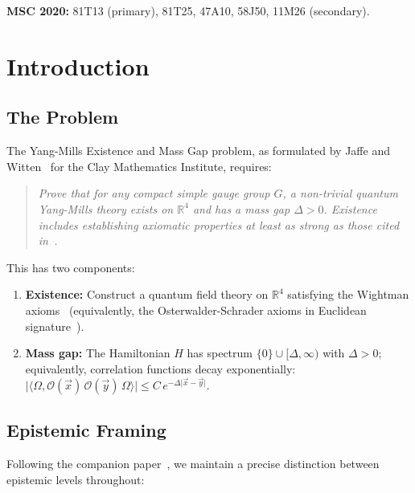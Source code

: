 \documentclass[11pt,a4paper]{article}
\theoremstyle{plain}
\theoremstyle{remark}
\renewcommand{\Omega}{\varOmega}
\newcommand{\R}{\mathbb{R}}
\newcommand{\abs}[1]{\lvert #1 \rvert}
\begin{document}
\vspace{12pt}
\noindent\textbf{\color{accent}MSC 2020:}
81T13 (primary), 81T25, 47A10, 58J50, 11M26 (secondary).

\newpage

\section{Introduction}
\label{sec:intro}

\subsection{The Problem}

The Yang-Mills Existence and Mass Gap problem, as formulated by Jaffe and
Witten~\cite{jaffe-witten2000} for the Clay Mathematics Institute, requires:

\begin{quote}
\itshape
Prove that for any compact simple gauge group $G$, a non-trivial quantum
Yang-Mills theory exists on $\R^4$ and has a mass gap $\Delta > 0$.
Existence includes establishing axiomatic properties at least as strong as
those cited in~\cite{osterwalder-schrader1973, osterwalder-schrader1975}.
\end{quote}

This has two components:
\begin{enumerate}[label=(\roman*)]
\item \textbf{Existence:} Construct a quantum field theory on $\R^4$
  satisfying the Wightman axioms~\cite{streater-wightman1964}
  (equivalently, the Osterwalder-Schrader axioms in Euclidean
  signature~\cite{osterwalder-schrader1973}).
\item \textbf{Mass gap:} The Hamiltonian $H$ has spectrum
  $\{0\} \cup [\Delta, \infty)$ with $\Delta > 0$; equivalently,
  correlation functions decay exponentially: $\abs{\langle\Omega,
  \mathcal{O}(\vec{x})\,\mathcal{O}(\vec{y})\,\Omega\rangle} \leq
  C \, e^{-\Delta\abs{\vec{x}-\vec{y}}}$.
\end{enumerate}

\subsection{Epistemic Framing}

Following the companion paper~\cite{DHR2026d}, we maintain a precise
distinction between epistemic levels throughout:
\end{document}
